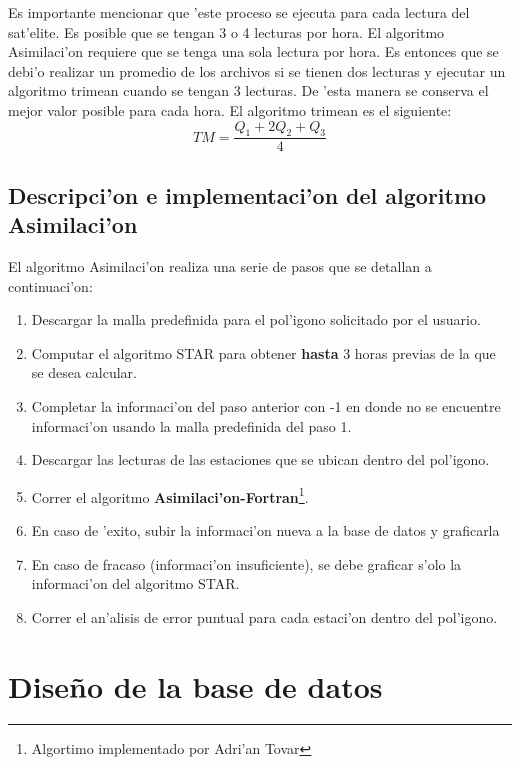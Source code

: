 Es importante mencionar que 'este proceso se ejecuta para cada lectura del sat'elite. Es posible que se tengan 3 o 4 lecturas por hora. El algoritmo 
Asimilaci'on requiere que se tenga una sola lectura por hora. Es entonces que se debi'o realizar un promedio de los archivos si se tienen dos lecturas y 
ejecutar un algoritmo trimean cuando se tengan 3 lecturas. De 'esta manera se conserva el mejor valor posible para cada hora.
El algoritmo trimean es el siguiente:
\begin{equation}
 TM=\frac{Q_1+2Q_2+Q_3}{4}
\end{equation} 

\subsection{Descripci'on e implementaci'on del algoritmo \\Asimilaci'on}
El algoritmo Asimilaci'on realiza una serie de pasos que se detallan a continuaci'on:
\begin{enumerate}
 \item Descargar la malla predefinida para el pol'igono solicitado por el usuario.
  \item Computar el algoritmo STAR para obtener \textbf{hasta} 3 horas previas de la que se desea calcular.
  \item Completar la informaci'on del paso anterior con -1 en donde no se encuentre informaci'on usando la malla predefinida del paso 1.
  \item Descargar las lecturas de las estaciones que se ubican dentro del pol'igono.
  \item Correr el algoritmo \textbf{Asimilaci'on-Fortran}\footnote{Algortimo implementado por Adri'an Tovar }.
  \item En caso de 'exito, subir la informaci'on nueva a la base de datos y graficarla
  \item En caso de fracaso (informaci'on insuficiente), se debe graficar s'olo la informaci'on del algoritmo STAR.
  \item Correr el an'alisis de error puntual para cada estaci'on dentro del pol'igono.
\end{enumerate}


\section{Dise\~no de la base de datos}

